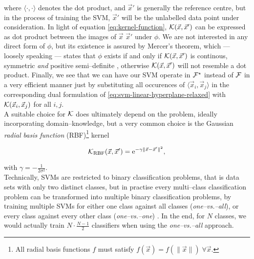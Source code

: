 where $\langle \cdot, \cdot \rangle$ denotes the dot product, and $\vec x'$ is generally the reference centre, but in the process of training the SVM, $\vec x'$ will be the unlabelled data point under consideration. In light of equation \ref{eq:kernel-function}, $\mathcal{K}(\vec x, \vec x')$ can be expressed as dot product between the images of $\vec x$ \resp $\vec x'$ under $\phi$. We are not interested in any direct form of $\phi$, but its existence is assured by Mercer's theorem, which --- loosely speaking --- states that $\phi$ exists if and only if $\mathcal{K}(\vec x, \vec x')$ is continous, symmetric \emph{and} positive semi--definite \citep{mercer1909}, otherwise $\mathcal{K}(\vec x, \vec x')$ will not resemble a dot product. Finally, we see that we can have our SVM operate in $\mathcal{F}^\star$ instead of $\mathcal{F}$ in a very efficient manner just by substituting all occurences of $\langle \vec x_i, \vec x_j \rangle$ in the corresponding dual formulation of \ref{eq:svm-linear-hyperplane-relaxed} with $\mathcal{K}({\vec x_i, \vec x_j})$ for all $i,j$. \\
 
A suitable choice for $\mathcal{K}$ does ultimately depend on the problem, ideally incorporating domain--knowledge, but a very common choice is the Gaussian \emph{radial basis function} (RBF)\footnote{All radial basis functions $f$ must satisfy $f(\vec x) = f(\|\vec x\|) \; \forall \vec x$.} kernel

\begin{equation}
\label{eq:rbf}
\mathcal{K}_{\text{RBF}}(\vec x, \vec x') = \mathrm{e}^{-\gamma \| \vec x - \vec x' \|^2},
\end{equation}

with $\gamma = -\frac{1}{2 \sigma^2}$.\\


Technically, SVMs are restricted to binary classification problems, that is data sets with only two distinct classes, but in practise every multi--class classification problem can be transformed into multiple binary classification problems, \eg by training multiple SVMs for either one class against all classes (\emph{one--vs.--all}), or every class against every other class (\emph{one--vs.--one}) \citep{knerr1990}. In the end, for $N$ classes, we would actually train $N \cdot \frac{N-1}{2}$ classifiers when using the \emph{one--vs.--all} approach.


